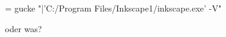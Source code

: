 \documentclass[ngerman]{scrartcl}
\begin{document}
\makeatletter
\ifnum\pdf@shellescape=\@ne\relax
gucke \@@input"|'C:/Program Files/Inkscape1/inkscape.exe' -V" %

\fi
oder was?
\end{document}
